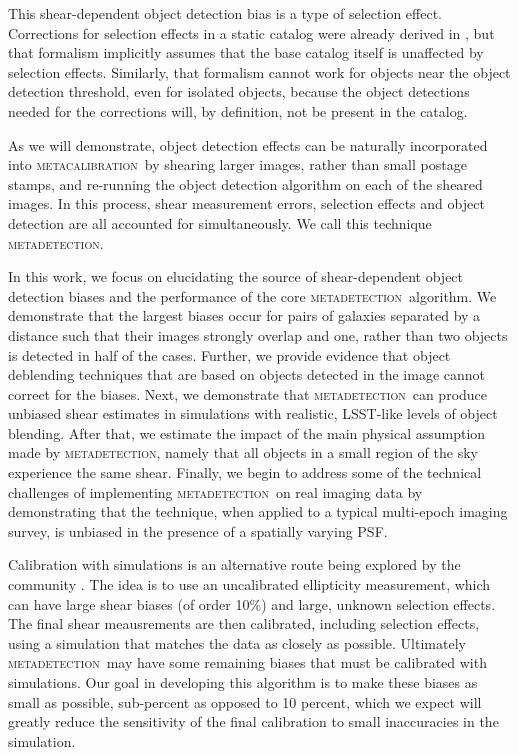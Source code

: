 \documentclass[fleqn,useAMS,usenatbib]{mnras}
\newcommand{\mcal}{\textsc{metacalibration}}
\newcommand{\mdet}{\textsc{metadetection}}
\begin{document}
This shear-dependent object detection bias is a type of selection effect.
Corrections for selection effects in a static catalog were already derived in
\cite{SheldonMcal2017}, but that formalism implicitly assumes that the base
catalog itself is unaffected by selection effects.  Similarly, that formalism
cannot work for objects near the object detection threshold, even for isolated
objects, because the object detections needed for the corrections will, by
definition, not be present in the catalog.

As we will demonstrate, object detection effects can be naturally incorporated
into \mcal\ by shearing larger images, rather than small postage stamps, and
re-running the object detection algorithm on each of the sheared images. In
this process, shear measurement errors, selection effects and object detection
are all accounted for simultaneously. We call this technique \mdet.

In this work, we focus on elucidating the source of shear-dependent object
detection biases and the performance of the core \mdet\ algorithm. We
demonstrate that the largest biases occur for pairs of galaxies separated by a
distance such that their images strongly overlap and one, rather than two
objects is detected in half of the cases.  Further, we provide evidence that
object deblending techniques that are based on objects detected in the image
cannot correct for the biases. Next, we demonstrate that \mdet\ can produce
unbiased shear estimates in simulations with realistic, LSST-like
\citep[e.g.,][]{chang2013} levels of object blending.  After that, we estimate
the impact of the main physical assumption made by \mdet, namely that all
objects in a small region of the sky experience the same shear. Finally, we
begin to address some of the technical challenges of implementing \mdet\ on
real imaging data by demonstrating that the technique, when applied to a
typical multi-epoch imaging survey, is unbiased in the presence of a spatially
varying PSF.

Calibration with simulations is an alternative route being explored by the
community \citep[see, e.g.,][]{HSCY1shear,KIDS450shear}.  The idea is to use an
uncalibrated ellipticity measurement, which can have large shear biases (of
order 10\%) and large, unknown selection effects.  The final shear meausrements
are then calibrated, including selection effects, using a simulation that
matches the data as closely as possible.  Ultimately \mdet\ may have some
remaining biases that must be calibrated with simulations.  Our goal in
developing this algorithm is to make these biases as small as possible,
sub-percent as opposed to 10 percent, which we expect will greatly reduce the
sensitivity of the final calibration to small inaccuracies in the simulation.
\end{document}
